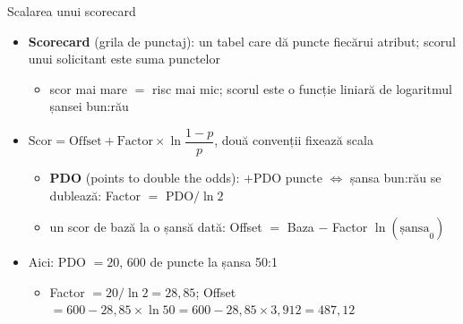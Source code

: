 \begin{frame}{Scalarea unui scorecard}
\itemsize{\small}
\begin{itemize}
    \item \textbf{Scorecard} (grila de punctaj): un tabel care dă puncte fiecărui atribut; scorul unui solicitant este suma punctelor 
    \begin{itemize}
        \item scor mai mare $=$ risc mai mic; scorul este o funcție liniară de logaritmul șansei bun:rău
    \end{itemize}
    \item $\text{Scor} = \text{Offset} + \text{Factor} \times \ln\dfrac{1 - p}{p}$, două convenții fixează scala
    \begin{itemize}
        \item \textbf{PDO} (points to double the odds): $+$PDO puncte $\Leftrightarrow$ șansa bun:rău se dublează: Factor $=$ PDO$/\ln 2$
        \item un scor de bază la o șansă dată: Offset $=$ Baza $-$ Factor $\ln(\text{șansa}_0)$
    \end{itemize}
    \item Aici: PDO $= 20$, 600 de puncte la șansa 50:1
    \begin{itemize}
        \item Factor $= 20/\ln 2 = 28{,}85$; Offset $= 600 - 28{,}85 \times \ln 50 = 600 - 28{,}85 \times 3{,}912 = 487{,}12$
    \end{itemize}
\end{itemize}
\end{frame}


